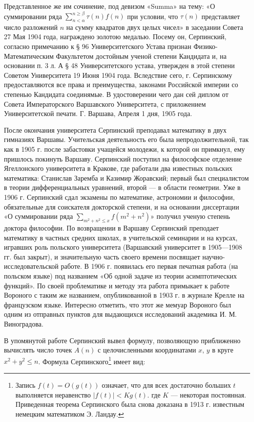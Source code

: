 \documentclass[12pt, a4paper, openany]{book}
\begin{document}
\hangindent=1.5cm  Представленное же им сочинение, под девизом «Summa» на тему: «О суммировании ряда $ \displaystyle\sum_{n<\alpha}^{n\geqslant\beta} \tau(n)f(n) $ при условии, что $\tau(n) $ представляет число разложений $n$ на сумму квадратов двух целых чисел» в заседании Совета 27 Мая 1904 года, награждено золотою медалью. Посему он, Серпинский, согласно примечанию к § 96 Университетского Устава признан Физико-Математическим Факультетом достойным ученой степени Кандидата и, на основании п. 3 л. А § 48 Университетского устава, утвержден в этой степени Советом Университета 19 Июня 1904 года. Вследствие сего, г. Серпинскому предоставляются все права и преимущества, законами Российской империи со степенью Кандидата соединямые. В удостоверении чего дан сей диплом от Совета Императорского Варшавского Университета, с приложением Университетской печати. Г. Варшава, Апреля 1 дня, 1905 года.

\hfill
	
После окончания университета Серпинский преподавал математику в двух гимназиях Варшавы. Учительская деятельность его была непродолжительной, так как в 1905 г. после забастовки учащейся молодежи, к которой он примкнул, ему пришлось покинуть Варшаву. Серпинский поступил на философское отделение Ягеллонского университета в Кракове, где работали два известных польских математика: Станислав Заремба и Казимир Жоравский; первый был специалистом в теории дифференциальных уравнений, второй — в области геометрии. Уже в 1906 г. Серпинский сдал экзамены по математике, астрономии и философии, обязательные для соискателя докторской степени, и на основании диссертации «О суммировании ряда $\displaystyle \sum_{m^2+n^2\leqslant x} f(m^2+n^2) $» получил ученую степень доктора философии. По возвращении в Варшаву Серпинский преподает математику в частных средних школах, в учительской семинарии и на курсах, игравших роль польского университета (Варшавский университет в 1905—1908 гг. был закрыт), и значительную часть своего времени посвящает научно-исследовательской работе. В 1906 г. появилась его первая печатная работа (на польском языке) под названием «Об одной задаче из теории асимптотических функций». По своей проблематике и методу эта работа примыкает к работе Вороного с таким же названием, опубликованной в 1903 г. в журнале Крелле на французском языке. Интересно отметить, что этот же мемуар Вороного был одним из отправных пунктов для выдающихся исследований академика И. М. Виноградова.

В упомянутой работе Серпинский вывел формулу, позволяющую приближенно вычислять число точек $A(n)$ с целочисленными координатами $x$, $y$ в круге $x^2+y^2\leqslant n$. Формула Серпинского{\footnote{Запись $f(t) = O(g(t))$ означает, что для всех достаточно больших $t$ выполняется неравенство $|f(t)| < Kg(t)$. где $K$ — некоторая постоянная. Приведенная теорема Серпинского была снова доказана в 1913 г. известным немецким математиком Э. Ландау.}} имеет вид:
\end{document}
